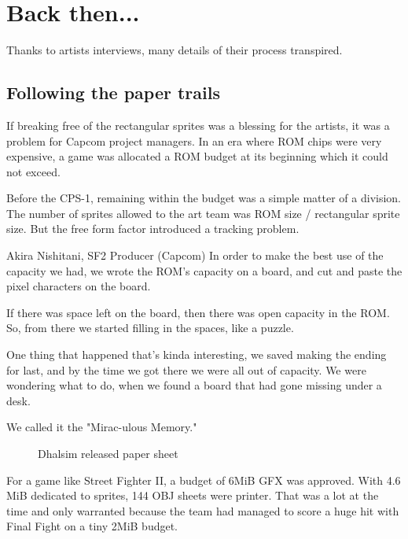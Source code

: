 


\section{Back then...}
Thanks to artists interviews, many details of their process transpired.

\subsection{Following the paper trails}
If breaking free of the rectangular sprites was a blessing for the artists, it was a problem for Capcom project managers. In an era where ROM chips were very expensive, a game was allocated a ROM budget at its beginning which it could not exceed.

Before the CPS-1, remaining within the budget was a simple matter of a division. The number of sprites allowed to the art team was ROM size / rectangular sprite size. But the free form factor introduced a tracking problem.

\begin{q}{Akira Nishitani, SF2 Producer (Capcom)}
In order to make the best use of the capacity we had, we wrote the ROM’s capacity on a board, and cut and paste the pixel characters on the board.

If there was space left on the board, then there was open capacity in the ROM. So, from there we started filling in the spaces, like a puzzle.

One thing that happened that's kinda interesting, we saved making the ending for last, and by the time we got there we were all out of capacity. We were wondering what to do, when we found a board that had gone missing under a desk.

We called it the "Mirac-ulous Memory."
\end{q}



 \begin{figure}[H]
\caption*{Dhalsim released paper sheet}
\end{figure}

For a game like Street Fighter II, a budget of 6MiB GFX was approved. With 4.6 MiB dedicated to sprites, 144 OBJ sheets were printer. That was a lot at the time and only warranted because the team had managed to score a huge hit with Final Fight on a tiny 2MiB budget. 

